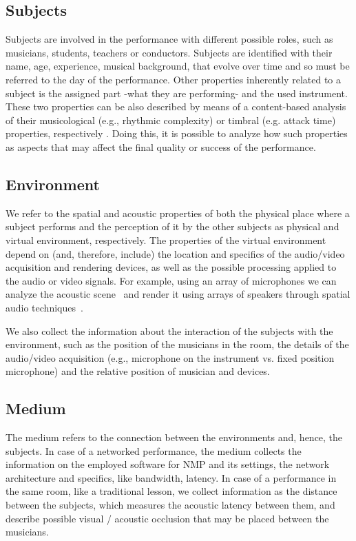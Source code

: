 \subsection{Subjects}
Subjects are involved in the performance with different possible roles, such as musicians, students, teachers or conductors. Subjects are identified with their name, age, experience, musical background, that evolve over time and so must be referred to the day of the performance. Other properties inherently related to a subject is the assigned part -what they are performing- and the used instrument. These two properties can be also described by means of a content-based analysis of their musicological (e.g., rhythmic complexity) or timbral (e.g. attack time) properties, respectively \cite{RottondiFeature}.
Doing this, it is possible to analyze how such properties as aspects that may affect the final quality or success of the performance.


\subsection{Environment}
We refer to the spatial and acoustic properties of both the physical place where a subject performs and the perception of it by the other subjects as physical and virtual environment, respectively. The properties of the virtual environment depend on (and, therefore, include) the location and specifics of the audio/video acquisition and rendering devices, as well as the possible processing applied to the audio or video signals. For example, using an array of microphones we can %
analyze the acoustic scene~\cite{Markovic2013} and render it using arrays of speakers through spatial audio techniques~\cite{bianchi2016}.

We also collect the information about the interaction of the subjects with the environment, such as the position of the musicians in the room, the details of the audio/video acquisition (e.g., microphone on the instrument vs. fixed position microphone) and the relative position of musician and devices. 

\subsection{Medium}
The medium refers to the connection between the environments and, hence, the subjects. In case of a networked performance, the medium collects the information on the employed software for NMP and its settings, the network architecture and specifics, like bandwidth, latency. In case of a performance in the same room, like a traditional lesson, we collect information as the distance between the subjects, which measures the acoustic latency between them, and describe possible visual / acoustic occlusion that may be placed between the musicians. 

